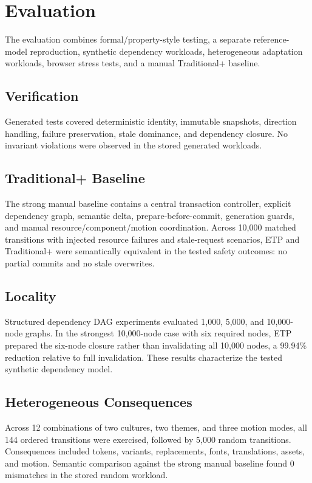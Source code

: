 \documentclass[manuscript,anonymous]{acmart}
\begin{document}
\section{Evaluation}
The evaluation combines formal/property-style testing, a separate reference-model
reproduction, synthetic dependency workloads, heterogeneous adaptation workloads, browser
stress tests, and a manual Traditional+ baseline.

\subsection{Verification}
Generated tests covered deterministic identity, immutable snapshots, direction handling,
failure preservation, stale dominance, and dependency closure. No invariant violations
were observed in the stored generated workloads.

\subsection{Traditional+ Baseline}
The strong manual baseline contains a central transaction controller, explicit dependency
graph, semantic delta, prepare-before-commit, generation guards, and manual
resource/component/motion coordination. Across 10,000 matched transitions with injected
resource failures and stale-request scenarios, ETP and Traditional+ were semantically
equivalent in the tested safety outcomes: no partial commits and no stale overwrites.

\subsection{Locality}
Structured dependency DAG experiments evaluated 1,000, 5,000, and 10,000-node graphs.
In the strongest 10,000-node case with six required nodes, ETP prepared the six-node closure
rather than invalidating all 10,000 nodes, a 99.94\% reduction relative to full invalidation.
These results characterize the tested synthetic dependency model.

\subsection{Heterogeneous Consequences}
Across 12 combinations of two cultures, two themes, and three motion modes, all 144 ordered
transitions were exercised, followed by 5,000 random transitions. Consequences included
tokens, variants, replacements, fonts, translations, assets, and motion. Semantic comparison
against the strong manual baseline found 0 mismatches in the stored random workload.
\end{document}
